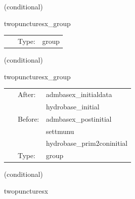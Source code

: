    (conditional) 

\hspace{5mm} twopuncturesx\_group 

\hspace{5mm}{\it twopuncturesx initial data group } 


\hspace{5mm}

 \begin{tabular*}{160mm}{cll} 
~ & Type:  & group \\ 
\end{tabular*} 


\vspace{5mm}

   (conditional) 

\hspace{5mm} twopuncturesx\_group 

\hspace{5mm}{\it twopuncturesx initial data group } 


\hspace{5mm}

 \begin{tabular*}{160mm}{cll} 
~ & After:  & admbasex\_initialdata \\ 
~& ~ &hydrobase\_initial\\ 
~ & Before:  & admbasex\_postinitial \\ 
~& ~ &settmunu\\ 
~& ~ &hydrobase\_prim2coninitial\\ 
~ & Type:  & group \\ 
\end{tabular*} 


\vspace{5mm}

   (conditional) 

\hspace{5mm} twopuncturesx 

\hspace{5mm}{\it create puncture black hole initial data } 


\hspace{5mm}

